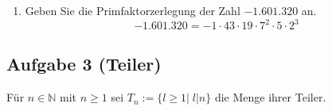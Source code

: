 \documentclass[11pt,a4paper,ngerman]{article}
\newcommand{\N}{\mathbb{N}}
\begin{document}
\begin{enumerate}[\bfseries a)]
\item Geben Sie die Primfaktorzerlegung der Zahl $-1.601.320$ an.\\

$$-1.601.320 = -1 \cdot 43 \cdot 19 \cdot 7^2 \cdot 5 \cdot 2^3$$

\end{enumerate}





\subsection*{Aufgabe 3 (Teiler)}

Für $n \in \N$ mit $n \geq 1$ sei $T_n := \{ l \geq 1 | \; l | n\}$ die Menge ihrer Teiler.
\end{document}
